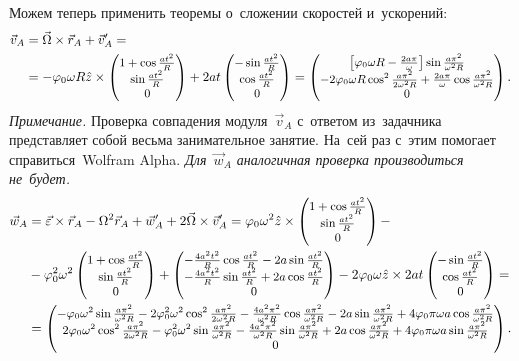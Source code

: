 \documentclass{weekly}
\begin{document}
Можем теперь применить теоремы о~сложении скоростей и~ускорений:
\begin{align}
\begin{split}
    \vec v_A &= \vec\Omega \times \vec r_A + \vec v'_A = \\
        &= -\varphi_0 \omega R \hat z \times
            \small\begin{pmatrix}1 + \cos\frac{at^2}{R}\\\sin\frac{at^2}{R}\\0\end{pmatrix} +
            2at \small\begin{pmatrix}-\sin\frac{at^2}{R}\\\cos\frac{at^2}{R}\\0\end{pmatrix}
        = \small\begin{pmatrix}\left[\varphi_0 \omega R -
            \frac{2a\pi}{\omega} \right]\sin\frac{a\pi^2}{\omega^2 R}\\-2\varphi_0 \omega R \cos^2\frac{a\pi^2}{2\omega^2 R} +
            \frac{2a\pi}{\omega} \cos\frac{a\pi^2}{\omega^2 R}\\0\end{pmatrix}.
        \label{2.14:vA}
\end{split}
\end{align}
\textsl{Примечание.} Проверка совпадения модуля~$\vec v_A$
с~ответом из~задачника представляет собой
весьма занимательное занятие. На~сей раз с~этим
помогает справиться~Wolfram Alpha. \emph{Для~$\vec w_A$
аналогичная проверка производиться не~будет.}
\begin{align}
\begin{split}
    \vec w_A &= \vec\varepsilon \times \vec r_A -
            \Omega^2 \vec r_A + \vec w_A' +
            2\vec\Omega \times \vec v_A'
        = \varphi_0 \omega^2 \hat z \times
            \small\begin{pmatrix}1 + \cos\frac{at^2}{R}\\\sin\frac{at^2}{R}\\0\end{pmatrix} -\\&- \varphi_0^2 \omega^2
            \small\begin{pmatrix}1 + \cos\frac{at^2}{R}\\\sin\frac{at^2}{R}\\0\end{pmatrix} +
            \small\begin{pmatrix}-\frac{4a^2 t^2}{R}\cos\frac{at^2}{R} -
            2a\sin\frac{at^2}{R}\\-\frac{4a^2 t^2}{R}\sin\frac{at^2}{R} +
            2a\cos\frac{at^2}{R}\\0\end{pmatrix} -
            2\varphi_0 \omega \hat z \times
            2at \small\begin{pmatrix}-\sin\frac{at^2}{R}\\\cos\frac{at^2}{R}\\0\end{pmatrix} = \\
        &= \small\begin{pmatrix}-\varphi_0\omega^2\sin\frac{a\pi^2}{\omega^2 R} -
                2\varphi_0^2\omega^2\cos^2\frac{a\pi^2}{2\omega^2 R}-
                \frac{4a^2 \pi^2}{\omega^2 R}\cos\frac{a\pi^2}
                {\omega^2 R} - 2a\sin\frac{a\pi^2}{\omega^2 R} +
                4\varphi_0\pi\omega a \cos\frac{a\pi^2}{\omega^2 R}\\2\varphi_0\omega^2\cos^2\frac{a\pi^2}{2\omega^2 R} -
                \varphi_0^2\omega^2\sin\frac{a\pi^2}{\omega^2 R} -
                \frac{4a^2 \pi^2}{\omega^2 R}\sin\frac{a\pi^2}
                {\omega^2 R} + 2a\cos\frac{a\pi^2}{\omega^2 R} +
                4\varphi_0\pi\omega a \sin\frac{a\pi^2}{\omega^2 R}\\0\end{pmatrix}. \label{2.14:wA}
\end{split}
\end{align}
\end{document}
